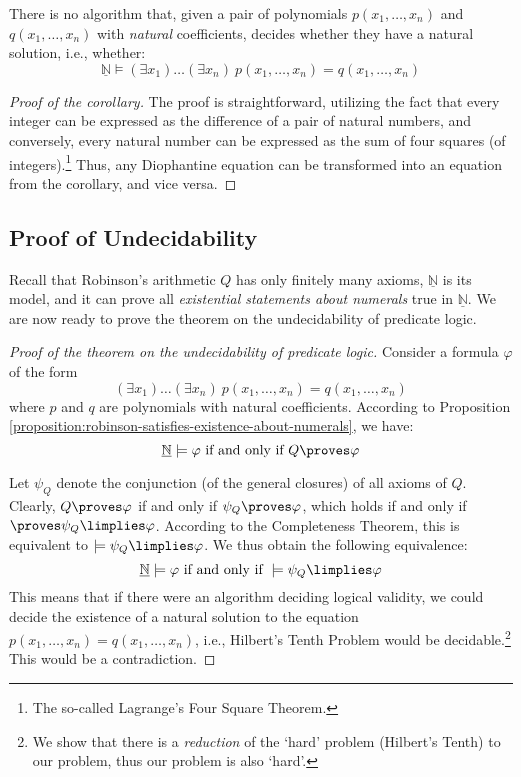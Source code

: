     \begin{corollary}
    There is no algorithm that, given a pair of polynomials $p(x_1,\dots,x_n)$ and $q(x_1,\dots,x_n)$ with \emph{natural} coefficients, decides whether they have a natural solution, i.e., whether:
    $$
    \underline{\mathbb N}\models(\exists x_1)\dots(\exists x_n)\ p(x_1,\dots,x_n)=q(x_1,\dots,x_n)
    $$
    \end{corollary}
    \begin{proof}[Proof of the corollary]
    The proof is straightforward, utilizing the fact that every integer can be expressed as the difference of a pair of natural numbers, and conversely, every natural number can be expressed as the sum of four squares (of integers).\footnote{The so-called Lagrange's Four Square Theorem.} Thus, any Diophantine equation can be transformed into an equation from the corollary, and vice versa.
    \end{proof}
    
    \subsection{Proof of Undecidability}
    
    Recall that Robinson's arithmetic $Q$ has only finitely many axioms, $\underline{\mathbb N}$ is its model, and it can prove all \emph{existential statements about numerals} true in $\underline{\mathbb N}$. We are now ready to prove the theorem on the undecidability of predicate logic.
    
    \begin{proof}[Proof of the theorem on the undecidability of predicate logic]
    Consider a formula $\varphi$ of the form 
    $$(\exists x_1)\dots(\exists x_n)\ p(x_1,\dots,x_n)=q(x_1,\dots,x_n)
    $$ 
    where $p$ and $q$ are polynomials with natural coefficients. According to Proposition \ref{proposition:robinson-satisfies-existence-about-numerals}, we have:
    $$
    \underline{\mathbb N}\models \varphi\text{ if and only if }Q\proves \varphi
    $$
    
    Let $\psi_Q$ denote the conjunction (of the general closures) of all axioms of $Q$. Clearly, $Q\proves\varphi$ if and only if $\psi_Q\proves\varphi$, which holds if and only if $\proves\psi_Q\limplies\varphi$. According to the Completeness Theorem, this is equivalent to $\models\psi_Q\limplies\varphi$. We thus obtain the following equivalence:
    $$
    \underline{\mathbb N}\models \varphi\text{ if and only if }\models \psi_Q\limplies\varphi
    $$
    This means that if there were an algorithm deciding logical validity, we could decide the existence of a natural solution to the equation $p(x_1,\dots,x_n)=q(x_1,\dots,x_n)$, i.e., Hilbert's Tenth Problem would be decidable.\footnote{We show that there is a \emph{reduction} of the `hard' problem (Hilbert's Tenth) to our problem, thus our problem is also `hard'.} This would be a contradiction.
    \end{proof}
    
